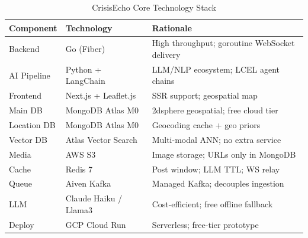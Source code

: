 \documentclass[conference]{IEEEtran}
\begin{document}
\begin{table}[h]
\caption{CrisisEcho Core Technology Stack}
\label{tab:techstack}
\renewcommand{\arraystretch}{1.2}
\begin{tabular}{p{1.4cm} p{2.0cm} p{4.2cm}}
\toprule
\textbf{Component} & \textbf{Technology} & \textbf{Rationale} \\
\midrule
Backend & Go (Fiber) & High throughput; goroutine WebSocket delivery \\
AI Pipeline & Python + LangChain & LLM/NLP ecosystem; LCEL agent chains \\
Frontend & Next.js + Leaflet.js & SSR support; geospatial map \\
Main DB & MongoDB Atlas M0 & 2dsphere geospatial; free cloud tier \\
Location DB & MongoDB Atlas M0 & Geocoding cache + geo priors \\
Vector DB & Atlas Vector Search & Multi-modal ANN; no extra service \\
Media & AWS S3 & Image storage; URLs only in MongoDB \\
Cache & Redis 7 & Post window; LLM TTL; WS relay \\
Queue & Aiven Kafka & Managed Kafka; decouples ingestion \\
LLM & Claude Haiku / Llama3 & Cost-efficient; free offline fallback \\
Deploy & GCP Cloud Run & Serverless; free-tier prototype \\
\bottomrule
\end{tabular}
\end{table}
\end{document}
